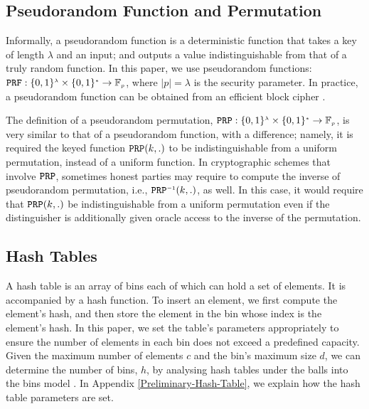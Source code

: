 %

\subsection{Pseudorandom Function and Permutation}


Informally, a pseudorandom function is a deterministic function that takes a key of length $\lambda$ and an input; and outputs a value  indistinguishable from that of  a truly random function.  In this paper, we use pseudorandom functions:   $\mathtt {PRF}: \{0,1\}^{\scriptscriptstyle \lambda}\times \{0,1\}^{\scriptscriptstyle *} \rightarrow  \mathbb{F}_{\scriptscriptstyle p}$, where $|p|=\lambda$ is the security parameter. In practice, a pseudorandom function can be obtained from an efficient block cipher \cite{DBLP:books/crc/KatzLindell2007}. 


The definition of a pseudorandom permutation, $\mathtt {PRP}: \{0,1\}^{\scriptscriptstyle \lambda}\times \{0,1\}^{\scriptscriptstyle *} \rightarrow  \mathbb{F}_{\scriptscriptstyle p}$, is very similar to that of a pseudorandom function, with a difference; namely, it is required the keyed function $\mathtt{PRP}(k,.)$ to be indistinguishable from a uniform permutation, instead of a uniform function. In cryptographic schemes that involve $\mathtt{PRP}$, sometimes honest parties may require to compute the inverse of pseudorandom permutation, i.e., $\mathtt {PRP}^{\scriptscriptstyle -1}(k, .)$, as well. In this case, it would require that $\mathtt{PRP}(k,.)$ be indistinguishable from a uniform permutation even if the distinguisher is additionally given oracle access to the inverse of the permutation. 





\subsection{Hash Tables}
A hash table is an array of   bins each of which can hold a set of elements. It is accompanied by a hash function. To insert an element, we first compute the element's hash,  and then store the element in the bin whose index is the element's hash. In this paper, we set the table's parameters appropriately to ensure the number of elements in each bin does not exceed a predefined capacity. Given the maximum number of elements $c$ and the bin's maximum size $d$, we can determine the number of bins, $h$, by analysing hash tables under the balls into the bins model  \cite{DBLP:conf/stoc/BerenbrinkCSV00}. In Appendix \ref{Preliminary-Hash-Table}, we explain how the hash table parameters are set.



